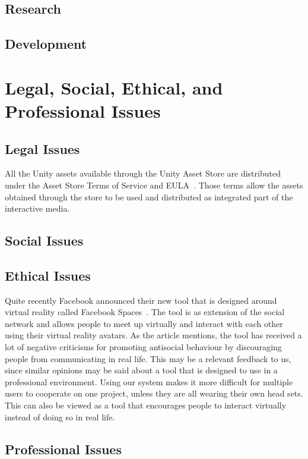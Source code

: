     \subsection{Research}
    
    \subsection{Development}

\section{Legal, Social, Ethical, and Professional Issues}

    \subsection{Legal Issues}
    \label{sec:legal}
        All the Unity assets available through the Unity Asset Store are distributed under the Asset Store Terms of Service and EULA~\cite{unity:terms}. Those terms allow the assets obtained through the store to be used and distributed as integrated part of the interactive media.
        
    \subsection{Social Issues}
    
    \subsection{Ethical Issues}
        Quite recently Facebook announced their new tool that is designed around virtual reality called Facebook Spaces~\cite{facebook2017}. The tool is as extension of the social network and allows people to meet up virtually and interact with each other using their virtual reality avatars. As the article mentions, the tool has received a lot of negative criticisms for promoting antisocial behaviour by discouraging people from communicating in real life. This may be a relevant feedback to us, since similar opinions may be said about a tool that is designed to use in a professional environment. Using our system makes it more difficult for multiple users to cooperate on one project, unless they are all wearing their own head sets. This can also be viewed as a tool that encourages people to interact virtually instead of doing so in real life.
        
    \subsection{Professional Issues}